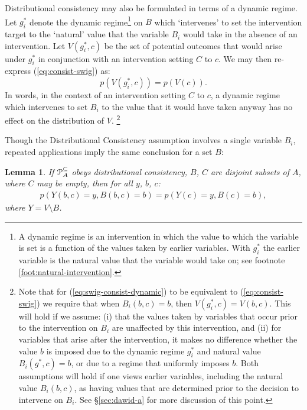 \documentclass[11pt]{article}
\newtheorem{lemma}[theorem]{Lemma}
\begin{document}
Distributional consistency may also be formulated in terms of a dynamic regime. 
Let $g_i^*$ denote the dynamic regime\footnote{A dynamic regime is an intervention in which the value to which the variable is set is a function of the values taken by earlier variables.
With $g_i^*$ the earlier variable is the natural value that the variable would take on; see footnote \ref{foot:natural-intervention}.}
on $B$ which `intervenes' to set the intervention target to the `natural' value that the variable $B_i$ would take in the absence of an intervention. 
Let $V(g^*_i,c)$ be the set of potential outcomes that would arise under $g^*_i$ in conjunction with an intervention setting $C$ to $c$.
We may then re-express 
(\ref{eq:consist-swig}) as:
\begin{equation}\label{eq:swig-consist-dynamic}
p(V(g^*_i,c)) = p(V(c)).
\end{equation}
In words, in the context of an intervention setting $C$ to $c$, a dynamic regime which intervenes to set $B_i$ to the value that it would have taken anyway  has no effect on the distribution of $V$.
\footnote{Note that for (\ref{eq:swig-consist-dynamic}) to be equivalent to (\ref{eq:consist-swig}) we require that 
when $B_i(b,c) =b$, then $V(g^*_i,c) = V(b,c)$. This will hold if we assume: (i) that the values taken by variables that occur prior to the intervention on $B_i$ are unaffected by this intervention, and (ii) for variables that arise after the intervention, it makes no difference whether the value $b$ is imposed due to the dynamic regime $g^*_i$ and natural value 
$B_i(g^*,c) =b$, or due to a regime that uniformly imposes $b$. Both assumptions will hold if one views earlier variables, including the natural value $B_i(b,c)$, as having values that are determined prior to the decision to intervene on $B_i$. See \S \ref{sec:dawid-a} for more discussion of this point.}

Though the Distributional Consistency assumption involves a single variable $B_i$, repeated applications imply the same conclusion for a set $B$:

\begin{lemma}\label{lem:dist-consistency-vector}
If ${\cal P}^{\tiny \subseteq}_A$  obeys distributional consistency,   $B$, $C$ are disjoint subsets of $A$, where $C$ may be empty,
then 
for all $y$, $b$, $c$:
\begin{align}\label{eq:consist-swig-vector}
p(Y({ b},{ c})\!=\!y, B({ b},{ c}) \!=\! { b}) = p(Y({ c})\!=\!y, B({ c}) \!=\! { b}),
\end{align}
where $Y=V\setminus B$.
\end{lemma}
\end{document}
